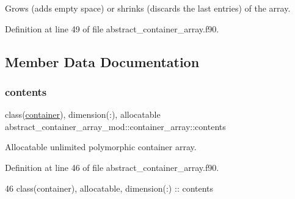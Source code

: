 Grows (adds empty space) or shrinks (discards the last entries) of the array. 



Definition at line 49 of file abstract\+\_\+container\+\_\+array.\+f90.



\subsection{Member Data Documentation}
\mbox{\label{structabstract__container__array__mod_1_1container__array_a506bf56ce508f7041b765c7d19959902}} 
\subsubsection{\texorpdfstring{contents}{contents}}
{\footnotesize\ttfamily class(\mbox{\hyperlink{structcontainer__mod_1_1container}{container}}), dimension(\+:), allocatable abstract\+\_\+container\+\_\+array\+\_\+mod\+::container\+\_\+array\+::contents\hspace{0.3cm}{\ttfamily [private]}}



Allocatable unlimited polymorphic container array. 



Definition at line 46 of file abstract\+\_\+container\+\_\+array.\+f90.


\begin{DoxyCode}
46         \textcolor{keywordtype}{class}(container), \textcolor{keywordtype}{allocatable}, \textcolor{keywordtype}{dimension(:)} :: contents
\end{DoxyCode}
\mbox{\label{structabstract__container__array__mod_1_1container__array_a0ec81671d521b7a118a83e79f1d40b56}} 
